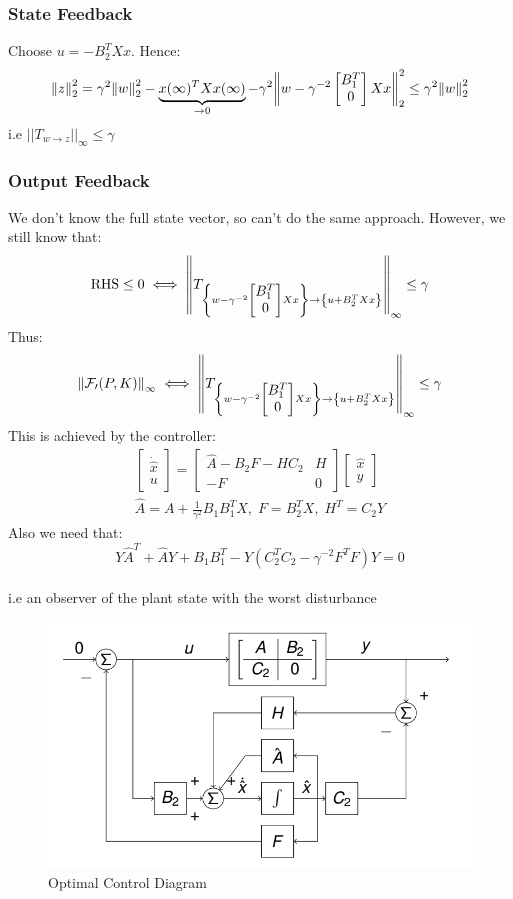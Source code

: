 \documentclass{article}
\begin{document}
\subsubsection*{State Feedback}
Choose $u =-B_2^TXx$. Hence:
\[
\norm{z}_2^2 = \gamma^2\norm{w}_2^2 - \underbrace{x(\infty)^TXx(\infty)}_{\rightarrow 0}  - \gamma^2 \norm \bigg{w-\gamma^{-2}\begin{bmatrix}
    B_1^T \\ 0
\end{bmatrix} Xx}_2^2 \leq \gamma^2 \norm{w}_2^2
\]
i.e $||T_{w \rightarrow z}||_\infty \leq \gamma$
\subsubsection*{Output Feedback}
We don't know the full state vector, so can't do the same approach. However, we still know that:
\[
\text{RHS} \leq 0 \iff \norm{T_{ \left \{w-\gamma^{-2}\begin{bmatrix}
    B_1^T \\ 0
\end{bmatrix} Xx \right \} \rightarrow \left\{u+B_2^TXx  \right \}}}_\infty \leq \gamma
\]
Thus:
\[
\norm{\mathcal{F_0}(P,K)}_\infty \iff \norm{T_{ \left \{w-\gamma^{-2}\begin{bmatrix}
    B_1^T \\ 0
\end{bmatrix} Xx \right \} \rightarrow \left\{u+B_2^TXx  \right \}}}_\infty \leq \gamma
\]
This is achieved by the controller:
\[
\begin{aligned}
\begin{bmatrix}
    \dot{\hat x} \\ u
\end{bmatrix}
= \begin{bmatrix}
    \hat A - B_2F - HC_2 & H \\ -F & 0
\end{bmatrix}
\begin{bmatrix}
    \hat x \\ y
\end{bmatrix}
\\ 
\hat A = A + \frac{1}{\gamma^2} B_1B_1^TX, \; F = B_2^TX, \; H^T = C_2Y
\end{aligned}
\]
Also we need that:
\[
Y \hat A^T + \hat A Y + B_1 B_1^T - Y(C_2^TC_2 - \gamma^{-2}F^T F)Y = 0
\] \\

i.e an observer of the plant state with the worst disturbance
\begin{figure}[H]
    \centering
\includegraphics[width = 0.5\linewidth]{Screenshot 2023-02-09 at 16.27.19.png}
\caption{Optimal Control Diagram}
\end{figure}
\end{document}

